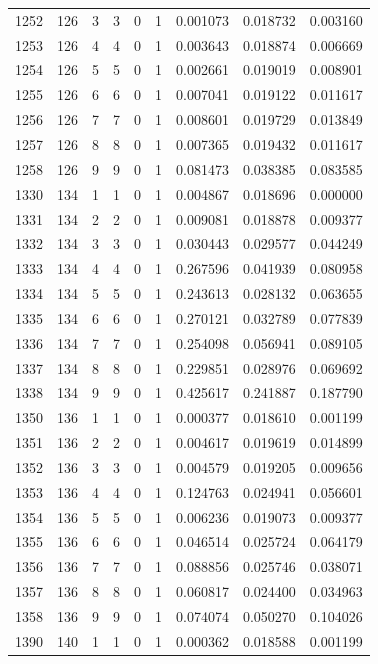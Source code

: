 \begin{longtable}{rrrrrrrrr}
1252 & 126 & 3 & 3 & 0 & 1 & 0.001073 & 0.018732 & 0.003160 \\
1253 & 126 & 4 & 4 & 0 & 1 & 0.003643 & 0.018874 & 0.006669 \\
1254 & 126 & 5 & 5 & 0 & 1 & 0.002661 & 0.019019 & 0.008901 \\
1255 & 126 & 6 & 6 & 0 & 1 & 0.007041 & 0.019122 & 0.011617 \\
1256 & 126 & 7 & 7 & 0 & 1 & 0.008601 & 0.019729 & 0.013849 \\
1257 & 126 & 8 & 8 & 0 & 1 & 0.007365 & 0.019432 & 0.011617 \\
1258 & 126 & 9 & 9 & 0 & 1 & 0.081473 & 0.038385 & 0.083585 \\
1330 & 134 & 1 & 1 & 0 & 1 & 0.004867 & 0.018696 & 0.000000 \\
1331 & 134 & 2 & 2 & 0 & 1 & 0.009081 & 0.018878 & 0.009377 \\
1332 & 134 & 3 & 3 & 0 & 1 & 0.030443 & 0.029577 & 0.044249 \\
1333 & 134 & 4 & 4 & 0 & 1 & 0.267596 & 0.041939 & 0.080958 \\
1334 & 134 & 5 & 5 & 0 & 1 & 0.243613 & 0.028132 & 0.063655 \\
1335 & 134 & 6 & 6 & 0 & 1 & 0.270121 & 0.032789 & 0.077839 \\
1336 & 134 & 7 & 7 & 0 & 1 & 0.254098 & 0.056941 & 0.089105 \\
1337 & 134 & 8 & 8 & 0 & 1 & 0.229851 & 0.028976 & 0.069692 \\
1338 & 134 & 9 & 9 & 0 & 1 & 0.425617 & 0.241887 & 0.187790 \\
1350 & 136 & 1 & 1 & 0 & 1 & 0.000377 & 0.018610 & 0.001199 \\
1351 & 136 & 2 & 2 & 0 & 1 & 0.004617 & 0.019619 & 0.014899 \\
1352 & 136 & 3 & 3 & 0 & 1 & 0.004579 & 0.019205 & 0.009656 \\
1353 & 136 & 4 & 4 & 0 & 1 & 0.124763 & 0.024941 & 0.056601 \\
1354 & 136 & 5 & 5 & 0 & 1 & 0.006236 & 0.019073 & 0.009377 \\
1355 & 136 & 6 & 6 & 0 & 1 & 0.046514 & 0.025724 & 0.064179 \\
1356 & 136 & 7 & 7 & 0 & 1 & 0.088856 & 0.025746 & 0.038071 \\
1357 & 136 & 8 & 8 & 0 & 1 & 0.060817 & 0.024400 & 0.034963 \\
1358 & 136 & 9 & 9 & 0 & 1 & 0.074074 & 0.050270 & 0.104026 \\
1390 & 140 & 1 & 1 & 0 & 1 & 0.000362 & 0.018588 & 0.001199 \\

\end{longtable}
